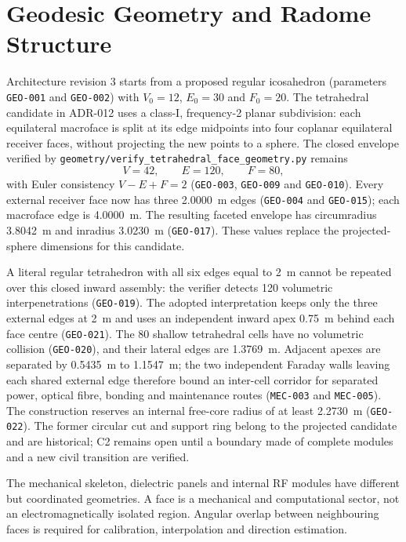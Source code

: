 \chapter{Geodesic Geometry and Radome Structure}

Architecture revision 3 starts from a proposed regular icosahedron (parameters \texttt{GEO-001} and \texttt{GEO-002}) with $V_0=12$, $E_0=30$ and $F_0=20$. The tetrahedral candidate in ADR-012 uses a class-I, frequency-2 planar subdivision: each equilateral macroface is split at its edge midpoints into four coplanar equilateral receiver faces, without projecting the new points to a sphere. The closed envelope verified by \texttt{geometry/verify\_tetrahedral\_face\_geometry.py} remains
\[
V=42,\qquad E=120,\qquad F=80,
\]
with Euler consistency $V-E+F=2$ (\texttt{GEO-003}, \texttt{GEO-009} and \texttt{GEO-010}). Every external receiver face now has three \SI{2.0000}{m} edges (\texttt{GEO-004} and \texttt{GEO-015}); each macroface edge is \SI{4.0000}{m}. The resulting faceted envelope has circumradius \SI{3.8042}{m} and inradius \SI{3.0230}{m} (\texttt{GEO-017}). These values replace the projected-sphere dimensions for this candidate.

A literal regular tetrahedron with all six edges equal to \SI{2}{m} cannot be repeated over this closed inward assembly: the verifier detects 120 volumetric interpenetrations (\texttt{GEO-019}). The adopted interpretation keeps only the three external edges at \SI{2}{m} and uses an independent inward apex \SI{0.75}{m} behind each face centre (\texttt{GEO-021}). The 80 shallow tetrahedral cells have no volumetric collision (\texttt{GEO-020}), and their lateral edges are \SI{1.3769}{m}. Adjacent apexes are separated by \SI{0.5435}{m} to \SI{1.1547}{m}; the two independent Faraday walls leaving each shared external edge therefore bound an inter-cell corridor for separated power, optical fibre, bonding and maintenance routes (\texttt{MEC-003} and \texttt{MEC-005}). The construction reserves an internal free-core radius of at least \SI{2.2730}{m} (\texttt{GEO-022}). The former circular cut and support ring belong to the projected candidate and are historical; C2 remains open until a boundary made of complete modules and a new civil transition are verified.

The mechanical skeleton, dielectric panels and internal RF modules have different but coordinated geometries. A face is a mechanical and computational sector, not an electromagnetically isolated region. Angular overlap between neighbouring faces is required for calibration, interpolation and direction estimation.

